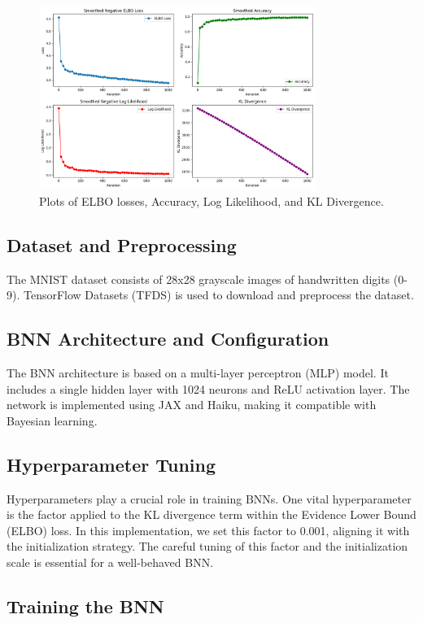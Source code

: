 \documentclass{article}
\begin{document}
\begin{figure}[h]
  \centering
  \includegraphics[width=0.8\textwidth]{download.png}  %
  \caption{Plots of ELBO losses, Accuracy, Log Likelihood, and KL Divergence.}
  \label{fig:plots}
\end{figure}

\subsection{Dataset and Preprocessing}

The MNIST dataset consists of 28x28 grayscale images of handwritten digits (0-9). TensorFlow Datasets (TFDS) is used to download and preprocess the dataset.

\subsection{BNN Architecture and Configuration}
The BNN architecture is based on a multi-layer perceptron (MLP) model. It includes a single hidden layer with 1024 neurons and ReLU activation layer. The network is implemented using JAX and Haiku, making it compatible with Bayesian learning.

\subsection{Hyperparameter Tuning}
Hyperparameters play a crucial role in training BNNs. One vital hyperparameter is the factor applied to the KL divergence term within the Evidence Lower Bound (ELBO) loss. In this implementation, we set this factor to 0.001, aligning it with the initialization strategy. The careful tuning of this factor and the initialization scale is essential for a well-behaved BNN.

\subsection{Training the BNN}
\end{document}
